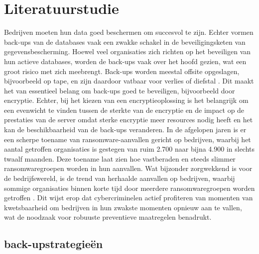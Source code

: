 \section{Literatuurstudie}%
\label{sec:literatuurstudie}
Bedrijven moeten hun data goed beschermen om succesvol te zijn. Echter vormen back-ups van de databases vaak een zwakke schakel in de beveiligingsketen van gegevensbescherming. Hoewel veel organisaties zich richten op het beveiligen van hun actieve databases, worden de back-ups vaak over het hoofd gezien, wat een groot risico met zich meebrengt. Back-ups worden meestal offsite opgeslagen, bijvoorbeeld op tape, en zijn daardoor vatbaar voor verlies of diefstal \autocite{Cherry2015}. Dit maakt het van essentieel belang om back-ups goed te beveiligen, bijvoorbeeld door encryptie. Echter, bij het kiezen van een encryptieoplossing is het belangrijk om een evenwicht te vinden tussen de sterkte van de encryptie en de impact op de prestaties van de server omdat sterke encryptie meer resources nodig heeft en het kan de beschikbaarheid van de back-ups veranderen. In de afgelopen jaren is er een scherpe toename van ransomware-aanvallen gericht op bedrijven, waarbij het aantal getroffen organisaties is gestegen van ruim 2.700 naar bijna 4.900 in slechts twaalf maanden. Deze toename laat zien hoe vastberaden en steeds slimmer ransomwaregroepen worden in hun aanvallen. Wat bijzonder zorgwekkend is voor de bedrijfswereld, is de trend van herhaalde aanvallen op bedrijven, waarbij sommige organisaties binnen korte tijd door meerdere ransomwaregroepen worden getroffen \autocite{Dikbiyik2024}. Dit wijst erop dat cybercriminelen actief profiteren van momenten van kwetsbaarheid om bedrijven in hun zwakste momenten opnieuw aan te vallen, wat de noodzaak voor robuuste preventieve maatregelen benadrukt.
\subsection{back-upstrategieën}%
